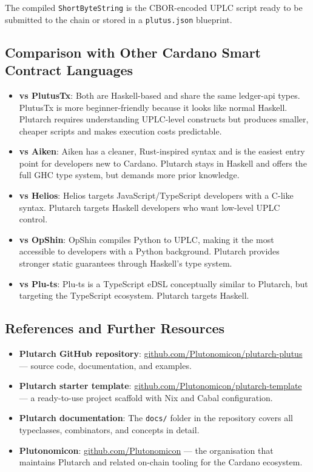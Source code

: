 The compiled \texttt{ShortByteString} is the CBOR-encoded UPLC script ready to be submitted to the chain or stored in a \texttt{plutus.json} blueprint.

\subsection{Comparison with Other Cardano Smart Contract Languages}

\begin{itemize}
    \item \textbf{vs PlutusTx}: Both are Haskell-based and share the same ledger-api types. PlutusTx is more beginner-friendly because it looks like normal Haskell. Plutarch requires understanding UPLC-level constructs but produces smaller, cheaper scripts and makes execution costs predictable.
    \item \textbf{vs Aiken}: Aiken has a cleaner, Rust-inspired syntax and is the easiest entry point for developers new to Cardano. Plutarch stays in Haskell and offers the full GHC type system, but demands more prior knowledge.
    \item \textbf{vs Helios}: Helios targets JavaScript/TypeScript developers with a C-like syntax. Plutarch targets Haskell developers who want low-level UPLC control.
    \item \textbf{vs OpShin}: OpShin compiles Python to UPLC, making it the most accessible to developers with a Python background. Plutarch provides stronger static guarantees through Haskell's type system.
    \item \textbf{vs Plu-ts}: Plu-ts is a TypeScript eDSL conceptually similar to Plutarch, but targeting the TypeScript ecosystem. Plutarch targets Haskell.
\end{itemize}

\subsection{References and Further Resources}

\begin{itemize}
    \item \textbf{Plutarch GitHub repository}: \href{https://github.com/Plutonomicon/plutarch-plutus}{github.com/Plutonomicon/plutarch-plutus} --- source code, documentation, and examples.
    \item \textbf{Plutarch starter template}: \href{https://github.com/Plutonomicon/plutarch-template}{github.com/Plutonomicon/plutarch-template} --- a ready-to-use project scaffold with Nix and Cabal configuration.
    \item \textbf{Plutarch documentation}: The \texttt{docs/} folder in the repository covers all typeclasses, combinators, and concepts in detail.
    \item \textbf{Plutonomicon}: \href{https://github.com/Plutonomicon}{github.com/Plutonomicon} --- the organisation that maintains Plutarch and related on-chain tooling for the Cardano ecosystem.
\end{itemize}